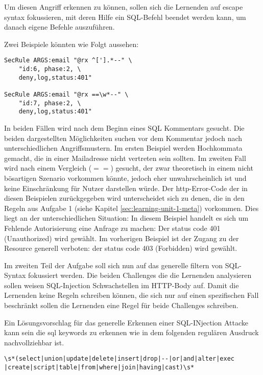 Um diesen Angriff erkennen zu können, sollen sich die Lernenden auf escape syntax fokussieren, mit deren Hilfe ein SQL-Befehl beendet werden kann, um danach eigene Befehle auszuführen.

Zwei Beispiele könnten wie Folgt aussehen:

\begin{verbatim}
SecRule ARGS:email "@rx ^['].*--" \ 
    "id:6, phase:2, \
    deny,log,status:401"

SecRule ARGS:email "@rx ==\w*--" \
    "id:7, phase:2, \
    deny,log,status:401"
\end{verbatim}

In beiden Fällen wird nach dem Beginn eines SQL Kommentars gesucht.
Die beiden dargestellten Möglichkeiten suchen vor dem Kommentar jedoch nach unterschiedlichen Angriffsmustern.
Im ersten Beispiel werden Hochkommata gemacht, die in einer Mailadresse nicht vertreten sein sollten.
Im zweiten Fall wird nach einem Vergleich ($==$) gesucht, der zwar theoretisch in einem nicht bösartigen Szenario vorkommen könnte, jedoch eher unwahrscheinlich ist und keine Einschränkung für Nutzer darstellen würde.
Der \ac{http}-Error-Code der in diesen Beispielen zurückgegeben wird unterscheidet sich zu denen, die in den Regeln aus Aufgabe 1 (siehe Kapitel \ref{sec:learning-unit-1-meta}) vorkommen.
Dies liegt an der unterschiedlichen Situation:
In diesem Beispiel handelt es sich um Fehlende Autorisierung eine Anfrage zu machen:
Der status code 401 (Unauthorized) wird gewählt.
Im vorherigen Beispiel ist der Zugang zu der Resource generell verboten: der status code 403 (Forbidden) wird gewählt.

Im zweiten Teil der Aufgabe soll sich nun auf das generelle filtern von SQL-Syntax fokussiert werden.
Die beiden Challenges die die Lernenden analysieren sollen weisen SQL-Injection Schwachstellen im HTTP-Body auf.
Damit die Lernenden keine Regeln schreiben können, die sich nur auf einen spezifischen Fall beschränkt sollen die Lernenden eine Regel für beide Challenges schreiben.

Ein Lösungsvorschlag für das generelle Erkennen einer SQL-INjection Attacke kann sein die sql keywords zu erkennen wie in dem folgenden regulären Ausdruck nachvollziehbar ist.

\begin{verbatim}
\s*(select|union|update|delete|insert|drop|--|or|and|alter|exec
|create|script|table|from|where|join|having|cast)\s*
\end{verbatim}


